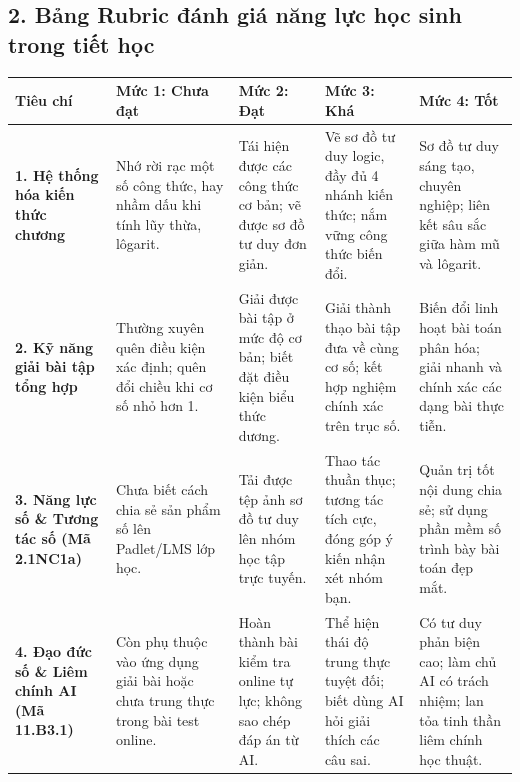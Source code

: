 \documentclass[12pt, a4paper]{article}
\begin{document}
\subsection*{2. Bảng Rubric đánh giá năng lực học sinh trong tiết học}

\begin{center}
\begin{tabularx}{\textwidth}{|p{2.8cm}|X|X|X|X|}
    \hline
    \textbf{Tiêu chí} & \textbf{Mức 1: Chưa đạt} & \textbf{Mức 2: Đạt} & \textbf{Mức 3: Khá} & \textbf{Mức 4: Tốt} \\ \hline
    \textbf{1. Hệ thống hóa kiến thức chương} & Nhớ rời rạc một số công thức, hay nhầm dấu khi tính lũy thừa, lôgarit. & Tái hiện được các công thức cơ bản; vẽ được sơ đồ tư duy đơn giản. & Vẽ sơ đồ tư duy logic, đầy đủ 4 nhánh kiến thức; nắm vững công thức biến đổi. & Sơ đồ tư duy sáng tạo, chuyên nghiệp; liên kết sâu sắc giữa hàm mũ và lôgarit. \\ \hline
    \textbf{2. Kỹ năng giải bài tập tổng hợp} & Thường xuyên quên điều kiện xác định; quên đổi chiều khi cơ số nhỏ hơn 1. & Giải được bài tập ở mức độ cơ bản; biết đặt điều kiện biểu thức dương. & Giải thành thạo bài tập đưa về cùng cơ số; kết hợp nghiệm chính xác trên trục số. & Biến đổi linh hoạt bài toán phân hóa; giải nhanh và chính xác các dạng bài thực tiễn. \\ \hline
    \textbf{3. Năng lực số \& Tương tác số (Mã 2.1NC1a)} & Chưa biết cách chia sẻ sản phẩm số lên Padlet/LMS lớp học. & Tải được tệp ảnh sơ đồ tư duy lên nhóm học tập trực tuyến. & Thao tác thuần thục; tương tác tích cực, đóng góp ý kiến nhận xét nhóm bạn. & Quản trị tốt nội dung chia sẻ; sử dụng phần mềm số trình bày bài toán đẹp mắt. \\ \hline
    \textbf{4. Đạo đức số \& Liêm chính AI (Mã 11.B3.1)} & Còn phụ thuộc vào ứng dụng giải bài hoặc chưa trung thực trong bài test online. & Hoàn thành bài kiểm tra online tự lực; không sao chép đáp án từ AI. & Thể hiện thái độ trung thực tuyệt đối; biết dùng AI hỏi giải thích các câu sai. & Có tư duy phản biện cao; làm chủ AI có trách nhiệm; lan tỏa tinh thần liêm chính học thuật. \\ \hline
\end{tabularx}
\end{center}
\end{document}
